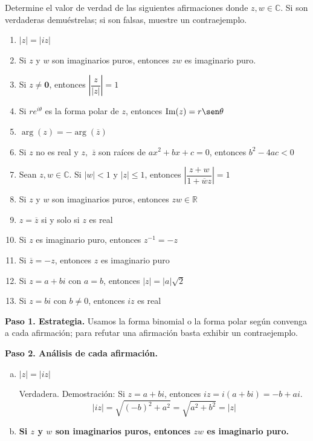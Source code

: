 \begin{prob}
Determine el valor de verdad de las siguientes afirmaciones donde $z, w \in \mathbb{C}$. Si son verdaderas demuéstrelas; si son falsas, muestre un contraejemplo.

\begin{enumerate}[$a)$]
\item  $|z|=|iz|$
\item  Si $z$ y $w$ son imaginarios puros, entonces $zw$ es imaginario puro.
\item  Si $z\neq \mathbf{0}$, entonces $\left|\dfrac{z}{|z|}\right|=1$
\item  Si $re^{i\theta}$ es la forma polar de $z$, entonces $\text{Im}(z)=r\sen \theta$
\item $\arg(z)=-\arg(\overline{z})$
\item  Si $z$ no es real y $z,$ $\overline{z}$ son raíces de $ax^2+bx+c=0$, entonces $b^2-4ac<0$
\item  Sean $z, w\in \mathbb{C}$. Si $|w|<1$ y $|z|\leq 1$, entonces $\left|\dfrac{z+w}{1+\overline{w}z}\right|=1$
\item  Si $z$ y $w$ son imaginarios puros, entonces $zw\in \mathbb{R}$
\item  $z=\overline{z}$ si y solo si $z$ es real
\item  Si $z$ es imaginario puro, entonces $z^{-1}=-z$
\item  Si $\overline{z}=-z$, entonces $z$ es imaginario puro
\item  Si $z=a+bi$ con $a=b$, entonces $|z|=|a|\sqrt{2}$
\item  Si $z=bi$ con $b\neq 0$, entonces $iz$ es real
\end{enumerate}
\begin{myproof}
\textbf{Paso 1. Estrategia.} Usamos la forma binomial o la forma polar según convenga a cada afirmación; para refutar una afirmación basta exhibir un contraejemplo.

\textbf{Paso 2. Análisis de cada afirmación.}

\begin{enumerate}[a)]
\item \textbf{$|z|=|iz|$}

Verdadera.  
Demostración: Si $z = a + bi$, entonces $iz = i(a+bi) = -b + ai$.  
\[
|iz| = \sqrt{(-b)^2 + a^2} = \sqrt{a^2 + b^2} = |z|
\]

\item \textbf{Si $z$ y $w$ son imaginarios puros, entonces $zw$ es imaginario puro.}


\end{enumerate}
\end{myproof}
\end{prob}
